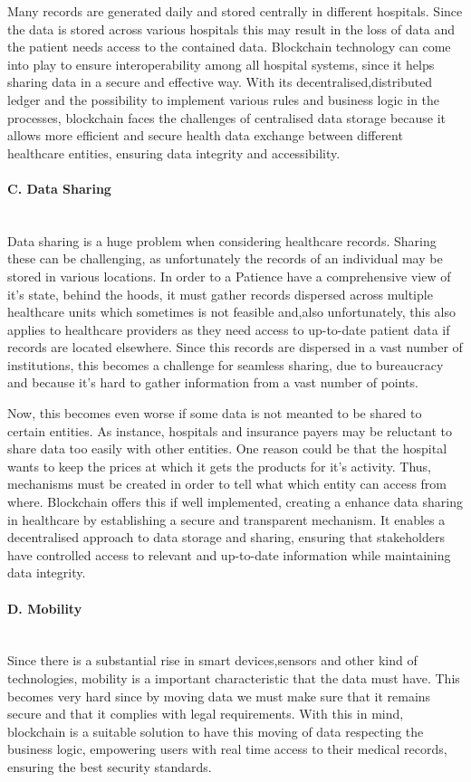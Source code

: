 Many records are generated daily and stored centrally in different hospitals. Since the data is stored across various hospitals this may result in the loss of data and the patient needs access to the contained data. Blockchain technology can come into play to ensure interoperability among all hospital systems, since it helps sharing data in a secure and effective way. With its decentralised,distributed ledger and the possibility to implement various rules and business logic in the processes, blockchain faces the challenges of centralised data storage because it allows more efficient and secure health data exchange between different healthcare entities, ensuring data integrity and accessibility. 

\paragraph{C. Data Sharing} \mbox{}\\
Data sharing is a huge problem when considering healthcare records. Sharing these can be challenging, as unfortunately the records of an individual may be stored in various locations. In order to a Patience have a comprehensive view of it's state, behind the hoods, it must gather records dispersed across multiple healthcare units which sometimes is not feasible and,also unfortunately, this also applies to healthcare providers as they need access to up-to-date patient data if records are located elsewhere. Since this records are dispersed in a vast number of institutions, this becomes a challenge for seamless sharing, due to bureaucracy and because it's hard to gather information from a vast number of points. 

Now, this becomes even worse if some data is not meanted to be shared to certain entities. As instance, hospitals and insurance payers may be reluctant to share data too easily with other entities. One reason could be that the hospital wants to keep the prices at which it gets the products for it's activity. Thus, mechanisms must be created in order to tell what which entity can access from where. Blockchain offers this if well implemented, creating a enhance data sharing in healthcare by establishing a secure and transparent mechanism. It enables a decentralised approach to data storage and sharing, ensuring that stakeholders have controlled access to relevant and up-to-date information while maintaining data integrity.

\paragraph{D. Mobility} \mbox{}\\
Since there is a substantial rise in smart devices,sensors and other kind of technologies, mobility is a important characteristic that the data must have. This becomes very hard since by moving data we must make sure that it remains secure and that it complies with legal requirements. With this in mind, blockchain is a suitable solution to have this moving of data respecting the business logic, empowering users with real time access to their medical records, ensuring the best security standards.

